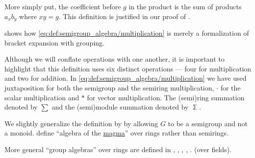 \begin{comments}
  \item More simply put, the coefficient before \( g \) in the product is the sum of products \( a_x b_y \) where \( xy = g \). This definition is justified in our proof of .

   shows how \eqref{eq:def:semigroup_algebra/multiplication} is merely a formalization of bracket expansion with grouping.

  \item Although we will conflate operations with one another, it is important to highlight that this definition uses six distinct operations --- four for multiplication and two for addition. In \eqref{eq:def:semigroup_algebra/multiplication} we have used juxtaposition for both the semigroup and the semiring multiplication, \( \cdot \) for the scalar multiplication and \( \ast \) for vector multiplication. The (semi)ring summation denoted by \( \sum \) and the (semi)module summation denoted by \( \Bbbsum \).

  \item We slightly generalize the definition by \cite[29]{Golan1999Semirings} by allowing \( G \) to be a semigroup and not a monoid. \Textcite[445]{Bourbaki1998Algebra1to3} define \enquote{algebra of the \hyperref[rem:magma_terminology]{magma}} over rings rather than semirings.

  More general \enquote{group algebras} over rings are defined in
  \cite[380]{Knapp2016BasicAlgebra},
  \cite[274]{Rotman2015AdvancedModernAlgebraPart1},
  \cite[127]{Jacobson1985BasicAlgebraI},
  \cite[106]{Lang2002Algebra},
  \cite[87]{Шафаревич2019ОсновныеПонятияАлгебры}.
  \cite[175]{Кострикин2020АлгебраЧасть3} (over fields).
\end{comments}
